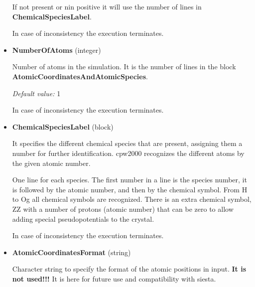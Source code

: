 \documentclass[11pt]{article}
\begin{document}
\begin{itemize}
  If not present or nin positive it will use the number of lines in
  {\bf ChemicalSpeciesLabel}.

  In case of inconsistency the execution terminates.

\item{\bf NumberOfAtoms} (integer)

  Number of atoms in the simulation.  It is the number of lines in the block
  {\bf AtomicCoordinatesAndAtomicSpecies}.

  \textit{Default value:}  1

  In case of inconsistency the execution terminates.


\item{\bf ChemicalSpeciesLabel} (block)

  It specifies the different chemical species that are
  present, assigning them a number for further identification.
  cpw2000 recognizes the different atoms by the given atomic number.

  One line for each species.
  The first number in a line is the species number, it is followed by
  the atomic number, and then by the chemical symbol.  From H to Og
  all chemical symbols are recognized.  There is an extra chemical
  symbol, ZZ with a number of protons (atomic number) that can be zero
  to allow adding special pseudopotentials to the crystal.

  In case of inconsistency the execution terminates.


\item{\bf AtomicCoordinatesFormat} (string)

  Character string to specify the format of the atomic positions in
  input.  {\bf It is not used!!!}  It is here for future use and
  compatibility with {\sc siesta}.


%
%
%
%
%
%
%


\end{itemize}
\end{document}
